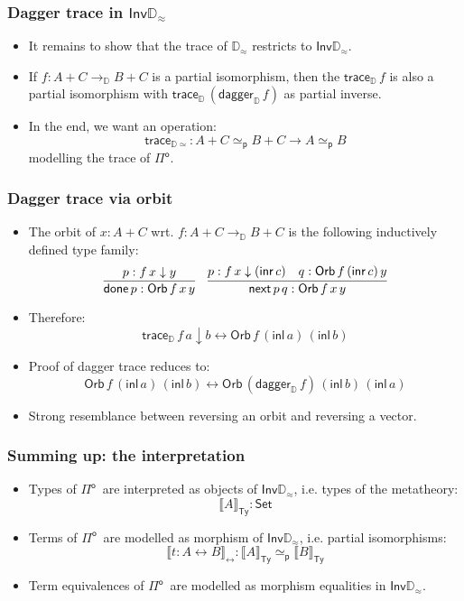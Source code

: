 \documentclass[12pt,t]{beamer}
\newcommand{\red}[1]{\textcolor{red}{#1}}
\newcommand{\Pio}{\ensuremath{\mathsf{\Pi}^{\mathsf{o}}}}
\newcommand{\Set}{\mathsf{Set}}
\newcommand{\inl}{\mathsf{inl}}
\newcommand{\inr}{\mathsf{inr}}
\newcommand{\Inv}{\mathsf{Inv}}
\newcommand{\lr}{\longleftrightarrow}
\newcommand{\LR}{\iff}
\newcommand{\dn}{\downarrow}
\newcommand{\D}{\mathbb{D}}
\newcommand{\Dapprox}{\mathbb{D}_{\approx}}
\newcommand{\traceD}{\mathsf{trace}_\D}
\newcommand{\daggerD}{\mathsf{dagger}_\D}
\newcommand{\Orb}[3]{\mathsf{Orb}\,#1\,#2\,#3}
\newcommand{\done}{\mathsf{done}}
\newcommand{\mynext}{\mathsf{next}}
\newcommand{\semTy}[1]{{\llbracket #1 \rrbracket}_\mathsf{Ty}}
\newcommand{\semTm}[1]{{\llbracket #1 \rrbracket}_{\lr}}
\newcommand{\semEq}[1]{{\llbracket #1 \rrbracket}_{\!\!\LR}}
\newcommand{\semTrace}{\mathsf{trace}_{\D\simeq}}
\begin{document}
\begin{frame}
  \frametitle{Dagger trace in $\Inv\Dapprox$}
  \begin{itemize}
  \item It remains to show that the trace of $\Dapprox$ restricts to
    $\Inv\Dapprox$.
  \item If $f : A + C \to_\D B + C$ is a partial isomorphism, then the
    $\traceD\,f$ is also a partial isomorphism with
    $\traceD\,(\daggerD\,f)$ as partial inverse.
  \item In the end, we want an operation:
    \[
    \semTrace : A + C\simeq_{\mathsf{p}} B + C \to A \simeq_{\mathsf{p}} B
    \]
    modelling the trace of \Pio.
   
  \end{itemize}
\end{frame}

\begin{frame}
  \frametitle{Dagger trace via orbit}
  \begin{itemize}
  \item The orbit of $x : A + C$ wrt. $f : A + C \to_{\D} B + C$
    is the following inductively defined type family:
    \[
    \infer{\done\,p : \Orb f x y}{p : f \,x \dn y} \quad
    \infer{\mynext\,p \,q : \Orb f x y}{p : f \,x \dn (\inr\,c) & q :
      \Orb f {(\inr\,c)} y}
    \]
  \item Therefore: %
    \[
    \traceD\,f\,a \dn b \leftrightarrow \Orb f{(\inl\,a)} {(\inl\,b)}
    \]
  \item Proof of dagger trace reduces to: 
    \[
    \Orb f {(\inl\,a)} {(\inl\,b)} \leftrightarrow \Orb
         {(\daggerD\,f)} {(\inl\,b)} {(\inl\,a)}
    \]
    \vspace{\fill}
  \item Strong resemblance between reversing an orbit and
    reversing a vector.
  \end{itemize}
\end{frame}

\begin{frame}
  \frametitle{Summing up: the interpretation}
  \begin{itemize}
  \item Types of \Pio\ are interpreted as objects of $\Inv\Dapprox$, i.e. types
    of the metatheory:
    \[
    \semTy A : \Set
    \]
  \item Terms of \Pio\ are modelled as morphism of $\Inv\Dapprox$,
i.e. partial isomorphisms:
    \[
    \semTm {t : A \lr B} : \semTy A \simeq_{\mathsf{p}} \semTy B
    \]
  \item Term equivalences of \Pio\ are modelled as morphism equalities
    in $\Inv\Dapprox$.
  \end{itemize}
  
\end{frame}
\end{document}
